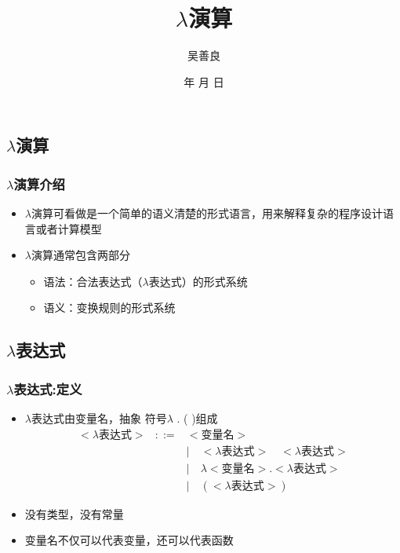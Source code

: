 \documentclass[CJKutf8,compress,hyperref]{beamer}
\renewcommand{\today}{\number\year 年 \number\month 月 \number\day 日}
\begin{document}
\begin{CJK}{UTF8}{song}
         
        \title{ $\lambda$演算}
        \author{ 吴善良}
        \date{ \today}

        \frame{\titlepage}
        \tableofcontents
        \section{ $\lambda$演算}

        \begin{frame}
          \frametitle{ $\lambda$演算介绍}
          \begin{itemize}
          \item $\lambda$演算可看做是一个简单的语义清楚的形式语言，用来解释复杂的程序设计语言或者计算模型
          \item $\lambda$演算通常包含两部分
            \begin{itemize} 
            \item{语法}：合法表达式（{\color{red}$\lambda$}表达式）的形式系统
            \item{语义}：变换规则的形式系统
            \end{itemize}
          \end{itemize}
        \end{frame}

        \subsection{  $\lambda$表达式}

        \begin{frame}
          \frametitle{ $\lambda$表达式:定义}
          \begin{itemize}
          \item $\lambda$表达式由变量名，抽象
            符号$\lambda$ . ( )组成 
              \begin{eqnarray}
                <\textrm{$\lambda$表达式}> & ::= & <\textrm{变量名}> \\
                & & \mid\quad <\textrm{$\lambda$表达式}>\quad<\textrm{$\lambda$表达式}> \\ 
                & & \mid\quad \lambda<\textrm{变量名}>.<\textrm{$\lambda$表达式}> \\
                & & \mid\quad (<\textrm{$\lambda$表达式}>)
              \end{eqnarray}    
        \item 没有类型，没有常量 
        \item 变量名不仅可以代表变量，还可以代表{\color{blue}函数}
        \end{itemize}
      \end{frame}
 

\end{CJK}
\end{document}
